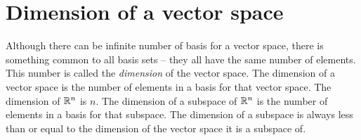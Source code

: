 \section{Dimension of a vector space}
Although there can be infinite number of basis for a vector space, there is something common to all basis sets -- they all have the same number of elements. This number is called the \textit{dimension} of the vector space. The dimension of a vector space is the number of elements in a basis for that vector space. The dimension of $\mathbb{R}^n$ is $n$. The dimension of a subspace of $\mathbb{R}^n$ is the number of elements in a basis for that subspace. The dimension of a subspace is always less than or equal to the dimension of the vector space it is a subspace of.